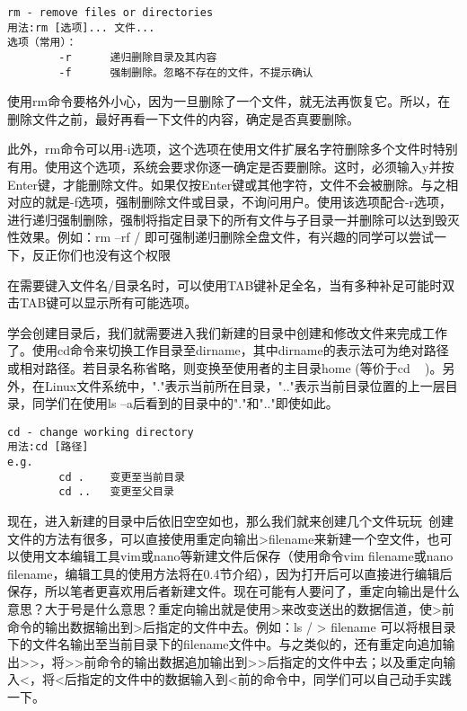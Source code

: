 \begin{verbatim}
rm - remove files or directories
用法:rm [选项]... 文件...
选项（常用）：
		-r		递归删除目录及其内容
		-f		强制删除。忽略不存在的文件，不提示确认
\end{verbatim}

\begin{note}
使用rm命令要格外小心，因为一旦删除了一个文件，就无法再恢复它。所以，在删除文件之前，最好再看一下文件的内容，确定是否真要删除。
\end{note}

此外，rm命令可以用-i选项，这个选项在使用文件扩展名字符删除多个文件时特别有用。使用这个选项，系统会要求你逐一确定是否要删除。这时，必须输入y并按Enter键，才能删除文件。如果仅按Enter键或其他字符，文件不会被删除。与之相对应的就是-f选项，强制删除文件或目录，不询问用户。使用该选项配合-r选项，进行递归强制删除，强制将指定目录下的所有文件与子目录一并删除可以达到毁灭性效果。例如：rm –rf / 即可强制递归删除全盘文件，有兴趣的同学可以尝试一下，反正你们也没有这个权限~

\begin{note}
在需要键入文件名/目录名时，可以使用TAB键补足全名，当有多种补足可能时双击TAB键可以显示所有可能选项。
\end{note}

学会创建目录后，我们就需要进入我们新建的目录中创建和修改文件来完成工作了。使用cd命令来切换工作目录至dirname，其中dirname的表示法可为绝对路径或相对路径。若目录名称省略，则变换至使用者的主目录home (等价于cd ~ )。另外，在Linux文件系统中，"."表示当前所在目录，".."表示当前目录位置的上一层目录，同学们在使用ls –a后看到的目录中的"."和".."即使如此。

\begin{verbatim}
cd - change working directory
用法:cd [路径]
e.g.
		cd .	变更至当前目录
		cd ..	变更至父目录
\end{verbatim}

现在，进入新建的目录中后依旧空空如也，那么我们就来创建几个文件玩玩~创建文件的方法有很多，可以直接使用重定向输出>filename来新建一个空文件，也可以使用文本编辑工具vim或nano等新建文件后保存（使用命令vim filename或nano filename，编辑工具的使用方法将在0.4节介绍），因为打开后可以直接进行编辑后保存，所以笔者更喜欢用后者新建文件。现在可能有人要问了，重定向输出是什么意思？大于号是什么意思？重定向输出就是使用>来改变送出的数据信道，使>前命令的输出数据输出到>后指定的文件中去。例如：ls / > filename 可以将根目录下的文件名输出至当前目录下的filename文件中。与之类似的，还有重定向追加输出>>，将>>前命令的输出数据追加输出到>>后指定的文件中去；以及重定向输入<，将<后指定的文件中的数据输入到<前的命令中，同学们可以自己动手实践一下。

